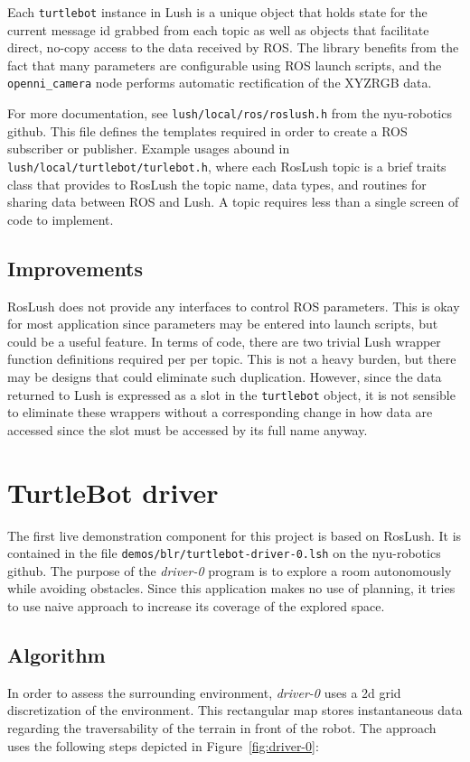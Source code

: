 \documentclass[letterpaper]{article}%
\begin{document}
Each {\tt turtlebot} instance in Lush is a unique \cpp{} object that holds
state for the current message id grabbed from each topic as well as objects
that facilitate direct, no-copy access to the data received by ROS. The library
benefits from the fact that many parameters are configurable using ROS launch
scripts, and the {\tt openni\_camera} node performs automatic rectification of
the XYZRGB data.

For more documentation, see {\tt lush/local/ros/roslush.h} from the
nyu-robotics github. This file defines the \cpp{} templates required in order
to create a ROS subscriber or publisher. Example usages abound in {\tt
lush/local/turtlebot/turlebot.h}, where each RosLush topic is a brief traits
class that provides to RosLush the topic name, data types, and routines for
sharing data between ROS and Lush. A topic requires less than a single screen
of code to implement.

\subsection{Improvements}
RosLush does not provide any interfaces to control ROS parameters. This is okay
for most application since parameters may be entered into launch scripts, but
could be a useful feature. In terms of code, there are two trivial Lush wrapper
function definitions required per per topic. This is not a heavy burden, but
there may be designs that could eliminate such duplication.  However, since the
data returned to Lush is expressed as a slot in the {\tt turtlebot} object, it
is not sensible to eliminate these wrappers without a corresponding change in
how data are accessed since the slot must be accessed by its full name anyway.

\section{TurtleBot driver}
The first live demonstration component for this project is based on RosLush. It
is contained in the file {\tt demos/blr/turtlebot-driver-0.lsh} on the
nyu-robotics github. The purpose of the {\em driver-0} program is to explore a
room autonomously while avoiding obstacles. Since this application makes no use
of planning, it tries to use naive approach to increase its coverage of the
explored space.

\subsection{Algorithm}
In order to assess the surrounding environment, {\em driver-0} uses a 2d grid
discretization of the environment. This rectangular map stores instantaneous
data regarding the traversability of the terrain in front of the robot.  The
approach uses the following steps depicted in Figure~\ref{fig:driver-0}:
\end{document}
